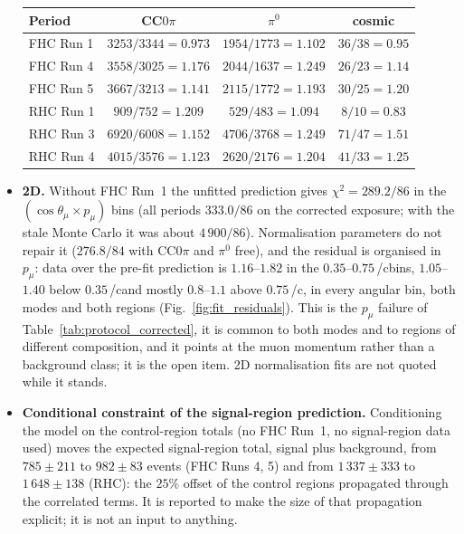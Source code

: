 \documentclass[11pt,a4paper]{article}
\newcommand{\GeVc}{\,\text{GeV}\!/c}
\begin{document}
\begin{itemize}
    \begin{center}\footnotesize
    \label{tab:perperiod_corrected}
    \begin{tabular}{lccc}\toprule
      Period & CC$0\pi$ & $\pi^0$ & cosmic \\ \midrule
      FHC Run 1 & $3253/3344 = 0.973$ & $1954/1773 = 1.102$ & $36/38 = 0.95$ \\
      FHC Run 4 & $3558/3025 = 1.176$ & $2044/1637 = 1.249$ & $26/23 = 1.14$ \\
      FHC Run 5 & $3667/3213 = 1.141$ & $2115/1772 = 1.193$ & $30/25 = 1.20$ \\
      RHC Run 1 & $909/752 = 1.209$ & $529/483 = 1.094$ & $8/10 = 0.83$ \\
      RHC Run 3 & $6920/6008 = 1.152$ & $4706/3768 = 1.249$ & $71/47 = 1.51$ \\
      RHC Run 4 & $4015/3576 = 1.123$ & $2620/2176 = 1.204$ & $41/33 = 1.25$ \\
      \bottomrule\end{tabular}\end{center}
  \item \textbf{2D.} Without FHC Run~1 the unfitted prediction gives $\chi^2=289.2/86$ in the $(\cos\theta_\mu\times
    p_\mu)$ bins (all periods $333.0/86$ on the corrected exposure; with the stale Monte Carlo it was about $4\,900/86$). Normalisation parameters do
    not repair it ($276.8/84$ with CC$0\pi$ and $\pi^0$ free), and the residual is organised in $p_\mu$: data over the pre-fit prediction is $1.16$--$1.82$
    in the $0.35$--$0.75$\GeVc bins, $1.05$--$1.40$ below $0.35$\GeVc and mostly $0.8$--$1.1$ above $0.75$\GeVc,
    in every angular bin, both modes and both regions (Fig.~\ref{fig:fit_residuals}). This is the $p_\mu$ failure of Table~\ref{tab:protocol_corrected}, it is
    common to both modes and to regions of different composition, and it points at the muon momentum rather than a
    background class; it is the open item. 2D normalisation fits are not quoted while it stands.
  \item \textbf{Conditional constraint of the signal-region prediction.} Conditioning the model on the control-region
    totals (no FHC Run~1, no signal-region data used) moves the expected signal-region total, signal plus
    background, from $785\pm211$ to $982\pm83$ events (FHC Runs 4, 5) and from $1\,337\pm333$ to $1\,648\pm138$ (RHC):
    the $25\%$ offset of the control regions propagated through the correlated terms. It is reported to make the
    size of that propagation explicit; it is not an input to anything.
\end{itemize}
\end{document}
